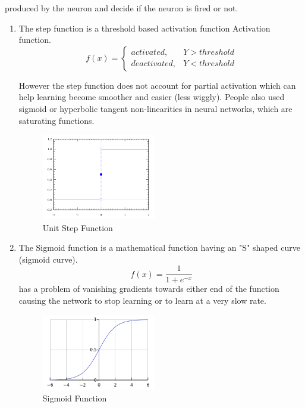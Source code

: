 produced by the neuron and decide if the neuron is fired or not. 
\begin{enumerate}[label=(\alph*)]
\item The step function is a threshold based activation function Activation function. 
\begin{equation}
    f(x)=\begin{cases}
            activated, & Y > threshold\\
            deactivated, & Y < threshold
        \end{cases}
\end{equation}

However the step function does not account for partial activation which can help learning become smoother and easier (less wiggly). People also used sigmoid or hyperbolic tangent non-linearities in neural networks, which are saturating functions. 
\begin{figure}[ht]
\centering
\includegraphics[width=50mm]{lectures/02-b/step_function.png}
\caption{Unit Step Function}
\label{fig:step_function}
\end{figure}

\item The Sigmoid function is a mathematical function having an "S" shaped curve (sigmoid curve).
\begin{equation}
    f(x) = \frac{1}{1+e^{-x}}
\end{equation}
has a problem of vanishing gradients towards either end of the function causing the network to stop learning or to learn at a very slow rate.

\begin{figure}[ht]
\centering
\includegraphics[width=50mm]{lectures/02-b/sigmoid_function.png}
\caption{Sigmoid Function}
\label{fig:sigmoid}
\end{figure}


\end{enumerate}
